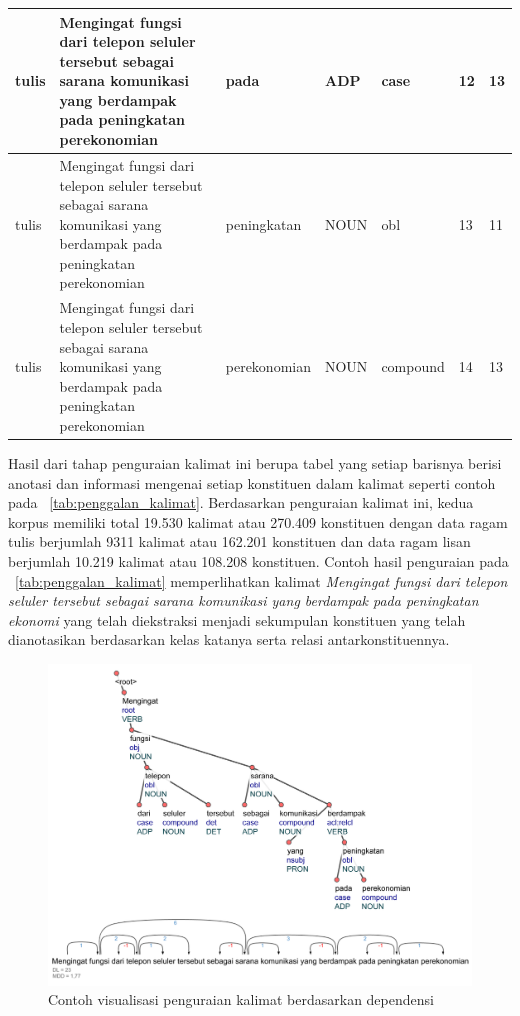\begin{center}
\begin{table}
\begin{tiny}
\begin{tabulary}{1\textwidth}{| L | L | L | L | L | L | L |}
tulis & Mengingat fungsi dari telepon seluler tersebut sebagai sarana komunikasi yang berdampak pada peningkatan perekonomian & pada & ADP & case & 12 & 13 \\ \hline
tulis & Mengingat fungsi dari telepon seluler tersebut sebagai sarana komunikasi yang berdampak pada peningkatan perekonomian & peningkatan & NOUN & obl & 13 & 11 \\ \hline
tulis & Mengingat fungsi dari telepon seluler tersebut sebagai sarana komunikasi yang berdampak pada peningkatan perekonomian & perekonomian & NOUN & compound & 14 & 13 \\ 
\hline
  \end{tabulary}  
\end{tiny}
\end{table}
\end{center}

Hasil dari tahap penguraian kalimat ini berupa tabel yang setiap barisnya berisi anotasi dan informasi mengenai setiap konstituen dalam kalimat seperti contoh pada \tab~\ref{tab:penggalan_kalimat}. Berdasarkan penguraian kalimat ini, kedua korpus memiliki total 19.530 kalimat atau 270.409 konstituen dengan data ragam tulis berjumlah 9311 kalimat atau 162.201 konstituen dan data ragam lisan berjumlah 10.219 kalimat atau 108.208 konstituen. Contoh hasil penguraian pada \tab~\ref{tab:penggalan_kalimat} memperlihatkan kalimat \textit{Mengingat fungsi dari telepon seluler tersebut sebagai sarana komunikasi yang berdampak pada peningkatan ekonomi} yang telah diekstraksi menjadi sekumpulan konstituen yang telah dianotasikan berdasarkan kelas katanya serta relasi antarkonstituennya. 

\begin{figure}
	\centering \includegraphics[width=1
	\textwidth] {pics/visualisasi_penguraian.jpg} 
	\caption{Contoh visualisasi penguraian kalimat berdasarkan dependensi} 
\label{fig:visualisasi_penguraian} \end{figure}

